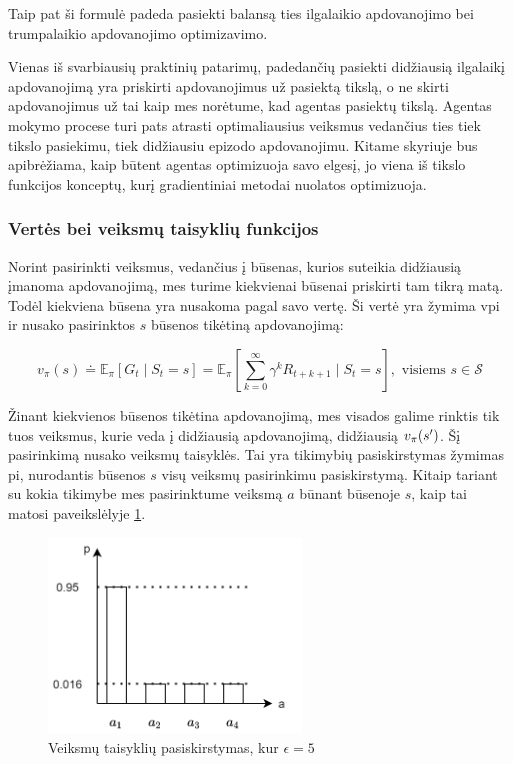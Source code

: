 \documentclass[a4paper, 12pt]{article}
\begin{document}
Taip pat ši formulė padeda pasiekti balansą ties ilgalaikio apdovanojimo bei trumpalaikio apdovanojimo optimizavimo.

\label{apdovanojimoPatarimas}
Vienas iš svarbiausių praktinių patarimų, padedančių pasiekti didžiausią ilgalaikį apdovanojimą yra priskirti apdovanojimus už pasiektą tikslą, o ne skirti apdovanojimus už tai kaip mes norėtume, kad agentas pasiektų tikslą. Agentas mokymo procese turi pats atrasti optimaliausius veiksmus vedančius ties tiek tikslo pasiekimu, tiek didžiausiu epizodo apdovanojimu. Kitame skyriuje bus apibrėžiama, kaip būtent agentas optimizuoja savo elgesį, jo viena iš tikslo funkcijos konceptų, kurį gradientiniai metodai nuolatos optimizuoja.


\subsubsection{Vertės bei veiksmų taisyklių funkcijos}

Norint pasirinkti veiksmus, vedančius į būsenas, kurios suteikia didžiausią įmanoma apdovanojimą, mes turime kiekvienai būsenai priskirti tam tikrą matą. Todėl kiekviena būsena yra nusakoma pagal savo vertę. Ši vertė yra žymima \gls{vpi} ir nusako pasirinktos $s$ būsenos tikėtiną apdovanojimą: 

\begin{equation}
v_{\pi}(s) \doteq \mathbb{E}_{\pi}\left[G_{t} \mid S_{t}=s\right]=\mathbb{E}_{\pi}\left[\sum_{k=0}^{\infty} \gamma^{k} R_{t+k+1} \mid S_{t}=s\right], \text { visiems } s \in \mathcal{S}
\end{equation}

Žinant kiekvienos būsenos tikėtina apdovanojimą, mes visados galime rinktis tik tuos veiksmus, kurie veda į didžiausią apdovanojimą, didžiausią $v_\pi(s\sp{\prime})$. Šį pasirinkimą nusako veiksmų taisyklės. Tai yra tikimybių pasiskirstymas žymimas \gls{pi}, nurodantis būsenos $s$ visų veiksmų pasirinkimu pasiskirstymą. Kitaip tariant su kokia tikimybe mes pasirinktume veiksmą $a$ būnant būsenoje $s$, kaip tai matosi paveikslėlyje \ref{policy}.

\begin{figure}[h]
\centering
\includegraphics[width=0.6\textwidth]{policy}
\caption{Veiksmų taisyklių pasiskirstymas, kur $\epsilon= 5$}
\label{policy}
\end{figure}
\end{document}

